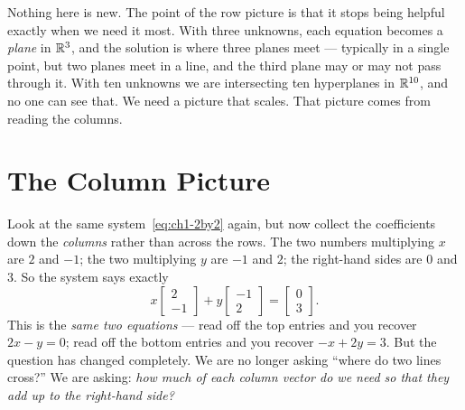 \begin{center}
\end{center}

Nothing here is new. The point of the row picture is that it stops being helpful exactly when we need it most. With three unknowns, each equation becomes a \emph{plane} in $\mathbb{R}^3$, and the solution is where three planes meet --- typically in a single point, but two planes meet in a line, and the third plane may or may not pass through it. With ten unknowns we are intersecting ten hyperplanes in $\mathbb{R}^{10}$, and no one can see that. We need a picture that scales. That picture comes from reading the columns.

\section{The Column Picture}

Look at the same system~\eqref{eq:ch1-2by2} again, but now collect the coefficients down the \emph{columns} rather than across the rows. The two numbers multiplying $x$ are $2$ and $-1$; the two multiplying $y$ are $-1$ and $2$; the right-hand sides are $0$ and $3$. So the system says exactly
\begin{equation}\label{eq:ch1-colpic}
x\begin{bmatrix} 2\\ -1\end{bmatrix}
+ y\begin{bmatrix} -1\\ 2\end{bmatrix}
= \begin{bmatrix} 0\\ 3\end{bmatrix}.
\end{equation}
This is the \emph{same two equations} --- read off the top entries and you recover $2x-y=0$; read off the bottom entries and you recover $-x+2y=3$. But the question has changed completely. We are no longer asking ``where do two lines cross?'' We are asking: \emph{how much of each column vector do we need so that they add up to the right-hand side?}

